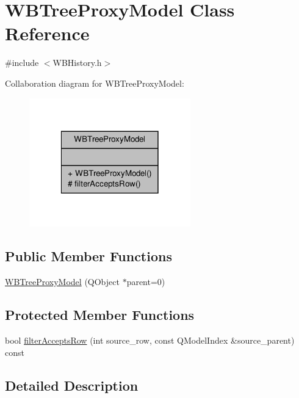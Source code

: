\hypertarget{class_w_b_tree_proxy_model}{\section{W\-B\-Tree\-Proxy\-Model Class Reference}
\label{d8/d6f/class_w_b_tree_proxy_model}
}


{\ttfamily \#include $<$W\-B\-History.\-h$>$}



Collaboration diagram for W\-B\-Tree\-Proxy\-Model\-:
\nopagebreak
\begin{figure}[H]
\begin{center}
\leavevmode
\includegraphics[width=198pt]{dc/daa/class_w_b_tree_proxy_model__coll__graph}
\end{center}
\end{figure}
\subsection*{Public Member Functions}
\begin{DoxyCompactItemize}
\item 
\hyperlink{class_w_b_tree_proxy_model_aaeeca7dd70d6625fd0c02859a9b82ce3}{W\-B\-Tree\-Proxy\-Model} (Q\-Object $\ast$parent=0)
\end{DoxyCompactItemize}
\subsection*{Protected Member Functions}
\begin{DoxyCompactItemize}
\item 
bool \hyperlink{class_w_b_tree_proxy_model_af924608072d205b08e26e3f6a42a32da}{filter\-Accepts\-Row} (int source\-\_\-row, const Q\-Model\-Index \&source\-\_\-parent) const 
\end{DoxyCompactItemize}


\subsection{Detailed Description}


